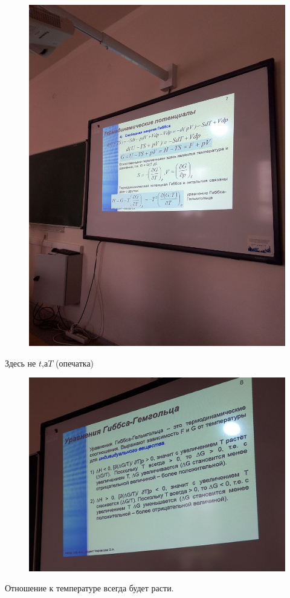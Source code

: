 \documentclass{article}
\begin{document}
\begin{figure}[H]
    \includegraphics[width=\textwidth]{6.jpg}
\end{figure}
Здесь не $t$,а$T$ (опечатка)

\begin{figure}[H]
    \includegraphics[width=\textwidth]{7.jpg}
\end{figure}
\par Отношение к температуре всегда будет расти. 
\end{document}
